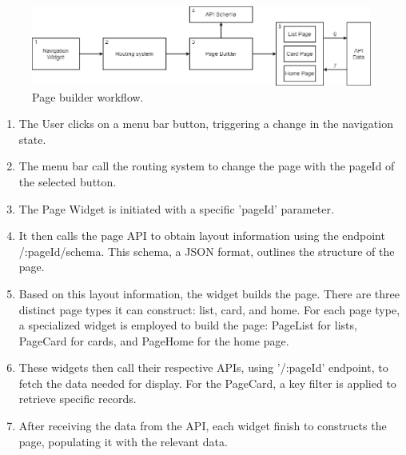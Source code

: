 \begin{figure}
    \centering
    \includegraphics[scale=0.47]{Pictures/5_page_builder.png}
    \caption{Page builder workflow.}
    \label{fig:5_page_builder}
\end{figure}

\begin{enumerate}
    \item The User clicks on a menu bar button, triggering a change in the navigation state.
    \item The menu bar call the routing system to change the page with the pageId of the selected
          button.
    \item The Page Widget is initiated with a specific 'pageId' parameter.
    \item It then calls the page API to obtain layout information using the endpoint\\
          /:pageId/schema. This schema, a JSON format, outlines the structure of the page.
    \item Based on this layout information, the widget builds the page. There are three distinct
          page types it can construct: list, card, and home. For each page type, a specialized
          widget is employed to build the page: PageList for lists, PageCard for cards, and PageHome
          for the home page.
    \item These widgets then call their respective APIs, using '/:pageId' endpoint, to fetch the
          data needed for display. For the PageCard, a key filter is applied to retrieve specific records.
    \item After receiving the data from the API, each widget finish to constructs the page,
          populating it with the relevant data.
\end{enumerate}


